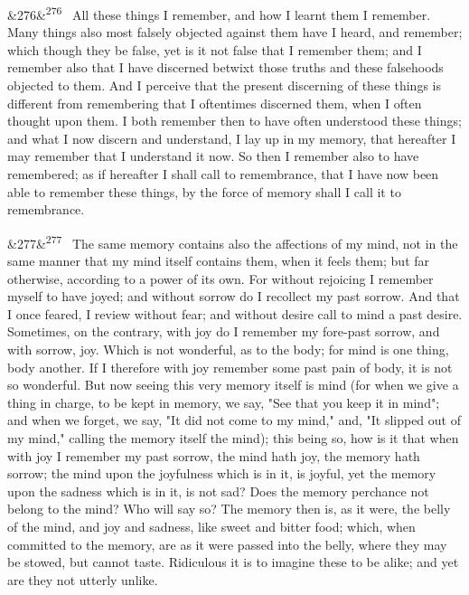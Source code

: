 \documentclass[12pt]{article}
\newcommand{\para}[1][]{\par\noindent\ifx&#1&\else\textsuperscript{\footnotesize #1}~\fi}
\begin{document}
\para[276] All these things I remember, and how I learnt them I remember. Many things also most falsely objected against them have I heard, and remember; which though they be false, yet is it not false that I remember them; and I remember also that I have discerned betwixt those truths and these falsehoods objected to them. And I perceive that the present discerning of these things is different from remembering that I oftentimes discerned them, when I often thought upon them. I both remember then to have often understood these things; and what I now discern and understand, I lay up in my memory, that hereafter I may remember that I understand it now. So then I remember also to have remembered; as if hereafter I shall call to remembrance, that I have now been able to remember these things, by the force of memory shall I call it to remembrance.

\para[277] The same memory contains also the affections of my mind, not in the same manner that my mind itself contains them, when it feels them; but far otherwise, according to a power of its own. For without rejoicing I remember myself to have joyed; and without sorrow do I recollect my past sorrow. And that I once feared, I review without fear; and without desire call to mind a past desire. Sometimes, on the contrary, with joy do I remember my fore-past sorrow, and with sorrow, joy. Which is not wonderful, as to the body; for mind is one thing, body another. If I therefore with joy remember some past pain of body, it is not so wonderful. But now seeing this very memory itself is mind (for when we give a thing in charge, to be kept in memory, we say, "See that you keep it in mind"; and when we forget, we say, "It did not come to my mind," and, "It slipped out of my mind," calling the memory itself the mind); this being so, how is it that when with joy I remember my past sorrow, the mind hath joy, the memory hath sorrow; the mind upon the joyfulness which is in it, is joyful, yet the memory upon the sadness which is in it, is not sad? Does the memory perchance not belong to the mind? Who will say so? The memory then is, as it were, the belly of the mind, and joy and sadness, like sweet and bitter food; which, when committed to the memory, are as it were passed into the belly, where they may be stowed, but cannot taste. Ridiculous it is to imagine these to be alike; and yet are they not utterly unlike.
\end{document}
